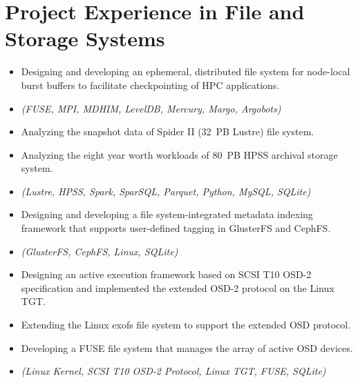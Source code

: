 \section{Project Experience in File and Storage Systems}

\begin{itemize}
 \item {Designing and developing an ephemeral, distributed file system for node-local burst buffers to
               facilitate checkpointing of HPC applications.}
 \item {\it\small (FUSE, MPI, MDHIM, LevelDB, Mercury, Margo, Argobots)}
\end{itemize}

\begin{itemize}
 \item {Analyzing the snapshot data of Spider II (32~PB Lustre) file system.}
 \item {Analyzing the eight year worth workloads of 80~PB HPSS archival storage system.}
 \item {\it\small (Lustre, HPSS, Spark, SparSQL, Parquet, Python, MySQL, SQLite)}
\end{itemize}

\begin{itemize}
 \item {Designing and developing a file system-integrated metadata indexing framework that supports user-defined tagging in GlusterFS and CephFS.}
 \item {\it\small (GlusterFS, CephFS, Linux, SQLite)}
\end{itemize}

\begin{itemize}
 \item {Designing an active execution framework based on SCSI T10 OSD-2
       specification and implemented the extended OSD-2 protocol on the Linux TGT.}
 \item {Extending the Linux exofs file system to support the extended OSD protocol.}
 \item {Developing a FUSE file system that manages the array of active OSD devices.}
 \item {\it\small(Linux Kernel, SCSI T10 OSD-2 Protocol, Linux TGT, FUSE, SQLite)}
\end{itemize}

